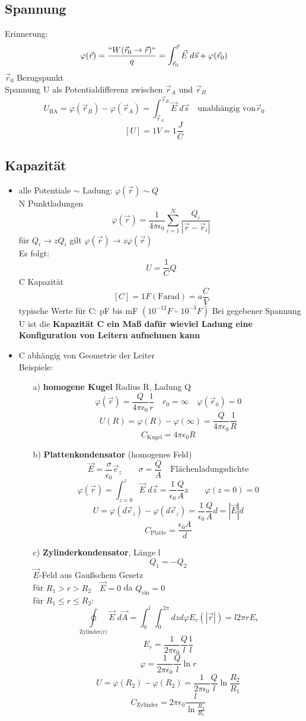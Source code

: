 \documentclass[titlepage,12pt,a4paper,ngerman]{report}
\newcommand{\tx}[1]{\textrm{#1}}
\begin{document}
\subsection{Spannung}
Erinnerung: $$\varphi(\vec{r}) = \frac{``W(\vec{r}_0 \rightarrow \vec{r})``}{q} = \int_{\vec{r}_0}^{\vec{r}} \vec{E} \; d\vec{s} + \varphi(\vec{r}_0)$$
$\vec{r}_0$ Bezugspunkt\\
Spannung U als Potentialdifferenz zwischen $\vec{r}_A$ und $\vec{r}_B$
$$U_{\tx{BA}} = \varphi(\vec{r}_B) - \varphi(\vec{r}_A)  = \int_{\vec{r}_A}^{\vec{r}_B} \vec{E} \; d\vec{s} \quad \textrm{unabhängig von} \vec{r}_0$$
$$[U] = 1 V = 1 \frac{J}{C}$$
\subsection{Kapazität}
\begin{itemize}
\item alle Potentiale $\sim$ Ladung: $\varphi(\vec{r}) \sim Q$\\
N Punktladungen $$\varphi(\vec{r}) = \frac{1}{4\pi\epsilon_0} \sum^N_{i=1} \frac{Q_i}{|\vec{r}-\vec{r}_i|}$$
für $Q_i \rightarrow z Q_i $ gilt $\varphi(\vec{r}) \rightarrow z \varphi(\vec{r})$\\
Es folgt: $$ U = \frac{1}{C} Q$$
C Kapazität $$[C] = 1 F (\tx{Farad}) = a \frac{C}{V}$$
typische Werte für C: pF bis mF $(10^{-12}F \tx{ - } 10^{-3}F)$
Bei gegebener Spannung U ist die \textbf{Kapazität C ein Maß dafür wieviel Ladung eine Konfiguration von Leitern aufnehmen kann}
\item C abhängig von Geometrie der Leiter\\
Beispiele:
\begin{itemize}
\item[a)] \textbf{homogene Kugel} Radius R, Ladung Q
$$\varphi(\vec{r}) = \frac{Q}{4\pi\epsilon_0} \frac{1}{r} \quad r_0 = \infty \quad \varphi(\vec{r}_0) = 0$$
$$U(R) = \varphi(R) - \varphi(\infty) = \frac{Q}{4\pi\epsilon_0} \frac{1}{R}$$
$$\boxed{ C_{\tx{Kugel}} = 4\pi\epsilon_0 R}$$
\item[b)] \textbf{Plattenkondensator} (homogenes Feld)
$$ \vec{E}= \frac{\sigma}{\epsilon_0} \vec{e}_z \qquad \sigma = \frac{Q}{A} \quad \textrm{Flächenladungsdichte}$$
$$\varphi(\vec{r}) = \int_{z=0}^{z} \vec{E} \; d\vec{z} = \frac{1}{\epsilon_0} \frac{Q}{A} z \qquad \varphi(z=0) = 0$$
$$U = \varphi(d\vec{e}_z) - \varphi(d \vec{e}_z) = \frac{1}{\epsilon_0} \frac{Q}{A} d = |\vec{E}| d$$
$$\boxed{C_{\tx{Platte}} = \frac{\epsilon_0 A}{d}}$$
\item[c)] \textbf{Zylinderkondensator}, Länge l 
$$ Q_1 = - Q_2$$
$ \vec{E}$-Feld aus Gaußschem Gesetz\\
für $R_1>r>R_2 \quad \vec{E}=0$ da $Q_{\tx{ein}} = 0$\\
für $R_1 \le r \le R_2$: 
$$\oint\limits_{\tx{Zylinder(r)}} \vec{E}\; d\vec{A} = \int_0^l \int_0^{2\pi} dz d\varphi E_r (|\vec{r}|) = l 2\pi r E_r$$
$$E_r = \frac{1}{2\pi\epsilon_0} \frac{Q}{l} \frac{1}{l}$$
$$\varphi = \frac{1}{2\pi\epsilon_0} \frac{Q}{l} \ln{r}$$
$$ U = \varphi(R_2) - \varphi(R_2) = \frac{1}{2 \pi \epsilon_0} \frac{Q}{l} \ln \frac{R_2}{R_1}$$
$$\boxed{C_{\tx{Zylinder}} = 2 \pi \epsilon_0 \frac{l}{\ln \frac{R_2}{R_1}}}$$


\end{itemize}
\end{itemize}
\end{document}
